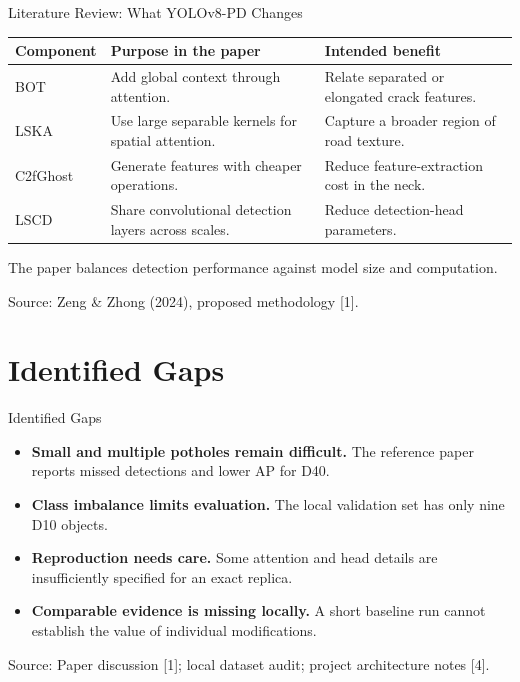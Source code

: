 \documentclass[aspectratio=169,11pt]{beamer}
\newcommand{\source}[1]{\par\vfill{\fontsize{7}{9}\selectfont\color{muted}Source: #1\par}}
\begin{document}
\begin{frame}{Literature Review: What YOLOv8-PD Changes}
\small
\renewcommand{\arraystretch}{1.5}
\begin{tabular}{p{2.8cm}p{5cm}p{5cm}}
\toprule\textbf{Component} & \textbf{Purpose in the paper} & \textbf{Intended benefit}\\\midrule
BOT & Add global context through attention. & Relate separated or elongated crack features.\\
LSKA & Use large separable kernels for spatial attention. & Capture a broader region of road texture.\\
C2fGhost & Generate features with cheaper operations. & Reduce feature-extraction cost in the neck.\\
LSCD & Share convolutional detection layers across scales. & Reduce detection-head parameters.\\\bottomrule
\end{tabular}
\medskip
The paper balances detection performance against model size and computation.
\source{Zeng \& Zhong (2024), proposed methodology [1].}
\end{frame}

\section{Identified Gaps}
\begin{frame}{Identified Gaps}
\begin{itemize}\setlength\itemsep{4mm}
\item \textbf{Small and multiple potholes remain difficult.} The reference paper reports missed detections and lower AP for D40.
\item \textbf{Class imbalance limits evaluation.} The local validation set has only nine D10 objects.
\item \textbf{Reproduction needs care.} Some attention and head details are insufficiently specified for an exact replica.
\item \textbf{Comparable evidence is missing locally.} A short baseline run cannot establish the value of individual modifications.
\end{itemize}
\source{Paper discussion [1]; local dataset audit; project architecture notes [4].}
\end{frame}
\end{document}
